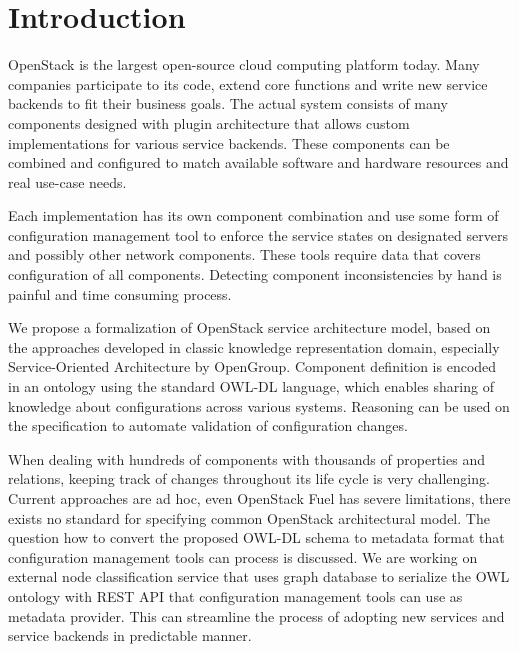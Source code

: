 
\section{Introduction}



OpenStack is the largest open-source cloud computing platform today. Many companies participate to its code, extend core functions and write new service backends to fit their business goals. The actual system consists of many components designed with plugin architecture that allows custom implementations for various service backends. These components can be combined and configured to match available software and hardware resources and real use-case needs.

Each implementation has its own component combination and use some form of configuration management tool to enforce the service states on designated servers and possibly other network components. These tools require data that covers configuration of all components. Detecting component inconsistencies by hand is painful and time consuming process.

We propose a formalization of OpenStack service architecture model, based on the approaches developed in classic knowledge representation domain, especially Service-Oriented Architecture by OpenGroup. Component definition is encoded in an ontology using the standard OWL-DL language, which enables sharing of knowledge about configurations across various systems. Reasoning can be used on the specification to automate validation of configuration changes.

When dealing with hundreds of components with thousands of properties and relations, keeping track of changes throughout its life cycle is very challenging. Current approaches are ad hoc, even OpenStack Fuel has severe limitations, there exists no standard for specifying common OpenStack architectural model. The question how to convert the proposed OWL-DL schema to metadata format that configuration management tools can process is discussed. We are working on external node classification service that uses graph database to serialize the OWL ontology with REST API that configuration management tools can use as metadata provider. This can streamline the process of adopting new services and service backends in predictable manner.

